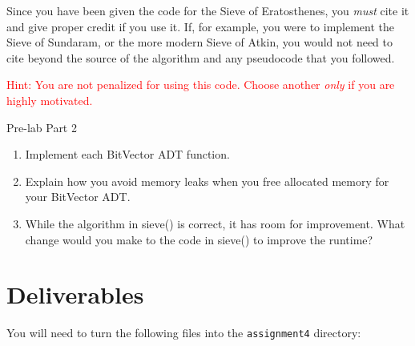 \documentclass[11pt,twocolumn]{article}
\begin{document}
Since you have been given the code for the Sieve of Eratosthenes,
you \emph{must} cite it and give proper credit if you use it. If,
for example, you were to implement the Sieve of Sundaram, or the
more modern Sieve of Atkin, you would not need to cite beyond the
source of the algorithm and any pseudocode that you followed.

\textcolor{red}{Hint: You are not penalized for using this code. Choose another
\emph{only} if you are highly motivated.}

\medskip
\begin{prelab}{Pre-lab Part 2}
    \begin{enumerate}
        \item Implement each BitVector ADT function.
        \item  Explain how you avoid memory leaks when you free allocated memory
            for your BitVector ADT.
        \item While the algorithm in sieve() is correct, it has room for
            improvement. What change would you make to the code in sieve() to
            improve the runtime?
    \end{enumerate}
\end{prelab}

\section{Deliverables}

You will need to turn the following files into the \texttt{assignment4}
directory:
\end{document}

